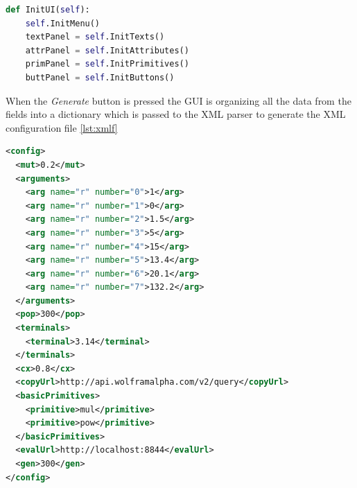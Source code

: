 \begin{lstlisting}[language=Python,caption={The method in the GUI that initializes all the components used},label={lst:guicode}]
def InitUI(self):
    self.InitMenu()
    textPanel = self.InitTexts()
    attrPanel = self.InitAttributes()
    primPanel = self.InitPrimitives()
    buttPanel = self.InitButtons()
\end{lstlisting}

When the \textit{Generate} button is pressed the GUI is organizing all the data from the fields into a dictionary which is passed to the XML parser to generate the XML configuration file \ref{lst:xmlf}

\begin{lstlisting}[language=XML,caption={XML file used by the framework for configuring the needed parameters},label={lst:xmlf}]
<config>
  <mut>0.2</mut>
  <arguments>
    <arg name="r" number="0">1</arg>
    <arg name="r" number="1">0</arg>
    <arg name="r" number="2">1.5</arg>
    <arg name="r" number="3">5</arg>
    <arg name="r" number="4">15</arg>
    <arg name="r" number="5">13.4</arg>
    <arg name="r" number="6">20.1</arg>
    <arg name="r" number="7">132.2</arg>
  </arguments>
  <pop>300</pop>
  <terminals>
    <terminal>3.14</terminal>
  </terminals>
  <cx>0.8</cx>
  <copyUrl>http://api.wolframalpha.com/v2/query</copyUrl>
  <basicPrimitives>
    <primitive>mul</primitive>
    <primitive>pow</primitive>
  </basicPrimitives>
  <evalUrl>http://localhost:8844</evalUrl>
  <gen>300</gen>
</config>
\end{lstlisting}

